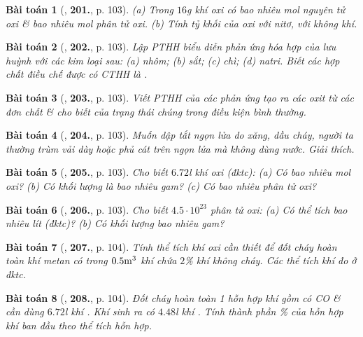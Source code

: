 \documentclass{article}
\numberwithin{equation}{section}
\newtheorem{baitoan}{Bài toán}
\begin{document}
\begin{baitoan}[\cite{An_400_BT_Hoa_Hoc_8_2020}, \textbf{201.}, p. 103]
	(a) Trong $16$\emph{g} khí oxi có bao nhiêu mol nguyên tử oxi \& bao nhiêu mol phân tử oxi. (b) Tính tỷ khối của oxi với nitơ, với không khí.
\end{baitoan}

\begin{baitoan}[\cite{An_400_BT_Hoa_Hoc_8_2020}, \textbf{202.}, p. 103]
	Lập PTHH biểu diễn phản ứng hóa hợp của lưu huỳnh với các kim loại sau: (a) nhôm; (b) sắt; (c) chì; (d) natri. Biết các hợp chất điều chế được có CTHH là \emph{}.
\end{baitoan}

\begin{baitoan}[\cite{An_400_BT_Hoa_Hoc_8_2020}, \textbf{203.}, p. 103]
	Viết PTHH của các phản ứng tạo ra các oxit \emph{} từ các đơn chất \& cho biết của trạng thái chúng trong điều kiện bình thường.
\end{baitoan}

\begin{baitoan}[\cite{An_400_BT_Hoa_Hoc_8_2020}, \textbf{204.}, p. 103]
	Muốn dập tắt ngọn lửa do xăng, dầu cháy, người ta thường trùm vải dày hoặc phủ cát trên ngọn lửa mà không dùng nước. Giải thích.
\end{baitoan}

\begin{baitoan}[\cite{An_400_BT_Hoa_Hoc_8_2020}, \textbf{205.}, p. 103]
	Cho biết $6.72$\emph{l} khí oxi (đktc): (a) Có bao nhiêu mol oxi? (b) Có khối lượng là bao nhiêu gam? (c) Có bao nhiêu phân tử oxi?
\end{baitoan}

\begin{baitoan}[\cite{An_400_BT_Hoa_Hoc_8_2020}, \textbf{206.}, p. 103]
	Cho biết $4.5\cdot10^{23}$ phân tử oxi: (a) Có thể tích bao nhiêu lít (đktc)? (b) Có khối lượng bao nhiêu gam?
\end{baitoan}

\begin{baitoan}[\cite{An_400_BT_Hoa_Hoc_8_2020}, \textbf{207.}, p. 104]
	Tính thể tích khí oxi cần thiết để đốt cháy hoàn toàn khí metan \emph{} có trong $0.5{\rm m}^3$ khí chứa $2$\% khí không cháy. Các thể tích khí đo ở đktc.
\end{baitoan}

\begin{baitoan}[\cite{An_400_BT_Hoa_Hoc_8_2020}, \textbf{208.}, p. 104]
	Đốt cháy hoàn toàn 1 hỗn hợp khí gồm có \emph{CO} \& \emph{} cần dùng $6.72$\emph{l} khí \emph{}. Khí sinh ra có $4.48$\emph{l} khí \emph{}. Tính thành phần \% của hỗn hợp khí ban đầu theo thể tích hỗn hợp.
\end{baitoan}
\end{document}
